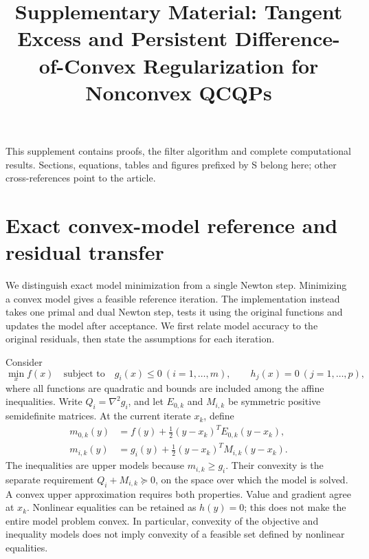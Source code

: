 \documentclass[pdflatex,sn-mathphys-num]{sn-jnl}
\theoremstyle{thmstyleone}
\theoremstyle{thmstylethree}
\newcounter{algorithm}
\begin{document}
\title{Supplementary Material: Tangent Excess and Persistent Difference-of-Convex Regularization for Nonconvex QCQPs}
\author*[1]{ }
\maketitle
\pagestyle{plain}
\raggedbottom


This supplement contains proofs, the filter algorithm and complete
computational results. Sections, equations, tables and figures prefixed
by S belong here; other cross-references point to the article.
\renewcommand{\thesection}{S\arabic{section}}
\renewcommand{\thetable}{S\arabic{table}}
\renewcommand{\thefigure}{S\arabic{figure}}
\renewcommand{\theequation}{S\arabic{equation}}

\section{Exact convex-model reference and residual transfer}\label{supp:exact-model}
We distinguish exact model minimization from a single Newton step. Minimizing a convex model gives a feasible reference iteration.
The implementation instead takes one primal and dual Newton step, tests
it using the original functions and updates the model after acceptance.
We first relate model accuracy to the original residuals, then state the
assumptions for each iteration.

Consider
\[
 \min_x f(x)\quad\text{subject to}\quad g_i(x)\leq0\ (i=1,\ldots,m),
 \qquad h_j(x)=0\ (j=1,\ldots,p),
\]
where all functions are quadratic and bounds are included among the affine
inequalities. Write $Q_i=\nabla^2g_i$, and let $E_{0,k}$ and $M_{i,k}$ be
symmetric positive semidefinite matrices. At the current iterate $x_k$, define
\begin{align}
 m_{0,k}(y)&=f(y)+\tfrac12(y-x_k)^TE_{0,k}(y-x_k),\\
 m_{i,k}(y)&=g_i(y)+\tfrac12(y-x_k)^TM_{i,k}(y-x_k).
 \label{eq:theory-upper model}
\end{align}
The inequalities are upper models because $m_{i,k}\geq g_i$. Their
convexity is the separate requirement $Q_i+M_{i,k}\succeq0$, on the space
over which the model is solved. A convex upper approximation requires
both properties. Value and gradient agree at $x_k$.
Nonlinear equalities can be retained as $h(y)=0$; this does not make the
entire model problem convex. In particular, convexity of the objective and
inequality models does not imply convexity of a feasible set defined by
nonlinear equalities.
\end{document}
